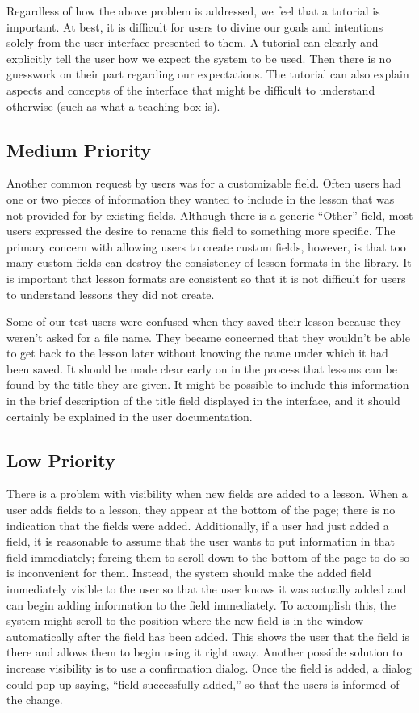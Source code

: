 \documentclass[10pt,letter,titlepage]{article}
\begin{document}
Regardless of how the above problem is addressed, we feel that a tutorial is
important. At best, it is difficult for users to divine our goals and intentions
solely from the user interface presented to them. A tutorial can clearly and
explicitly tell the user how we expect the system to be used. Then there is no
guesswork on their part regarding our expectations. The tutorial can also
explain aspects and concepts of the interface that might be difficult to
understand otherwise (such as what a teaching box is).

\subsection{Medium Priority}
Another common request by users was for a customizable field. Often users had
one or two pieces of information they wanted to include in the lesson that was
not provided for by existing fields. Although there is a generic ``Other''
field, most users expressed the desire to rename this field to something more
specific. The primary concern with allowing users to create custom fields,
however, is that too many custom fields can destroy the consistency of lesson
formats in the library. It is important that lesson formats are consistent so
that it is not difficult for users to understand lessons they did not create.

Some of our test users were confused when they saved their lesson because they
weren't asked for a file name. They became concerned that they wouldn't be able
to get back to the lesson later without knowing the name under which it had been
saved. It should be made clear early on in the process that lessons can be found
by the title they are given. It might be possible to include this information in
the brief description of the title field displayed in the interface, and it
should certainly be explained in the user documentation.

\subsection{Low Priority}
There is a problem with visibility when new fields are added to a lesson. When
a user adds fields to a lesson, they appear at the bottom of the page; there is
no indication that the fields were added. Additionally, if a user had just added
a field, it is reasonable to assume that the user wants to put information in
that field immediately; forcing them to scroll down to the bottom of the page to
do so is inconvenient for them. Instead, the system should make the added field
immediately visible to the user so that the user knows it was actually added and
can begin adding information to the field immediately. To accomplish this, the
system might scroll to the position where the new field is in the window
automatically after the field has been added. This shows the user that the field
is there and allows them to begin using it right away. Another possible solution
to increase visibility is to use a confirmation dialog. Once the field is added,
a dialog could pop up saying, ``field successfully added,'' so that the users is
informed of the change.
\end{document}
